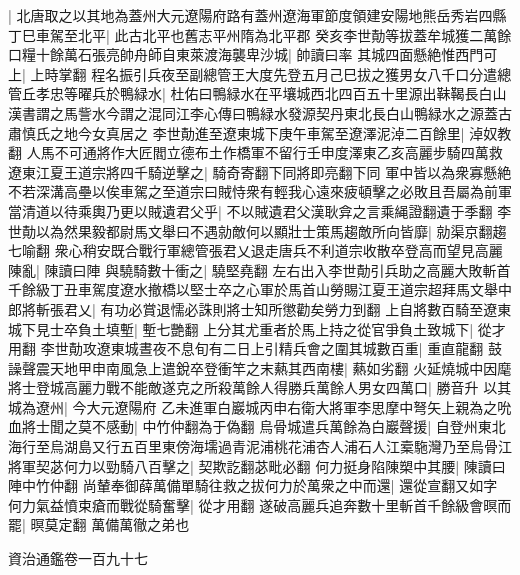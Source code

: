 |{
	北唐取之以其地為蓋州大元遼陽府路有蓋州遼海軍節度領建安陽地熊岳秀岩四縣}
丁巳車駕至北平|{
	此古北平也舊志平州隋為北平郡}
癸亥李世勣等拔蓋牟城獲二萬餘口糧十餘萬石張亮帥舟師自東萊渡海襲卑沙城|{
	帥讀曰率}
其城四面懸絶惟西門可上|{
	上時掌翻}
程名振引兵夜至副總管王大度先登五月己巳拔之獲男女八千口分遣總管丘孝忠等曜兵於鴨緑水|{
	杜佑曰鴨緑水在平壤城西北四百五十里源出靺鞨長白山漢書謂之馬訾水今謂之混同江李心傳曰鴨緑水發源契丹東北長白山鴨緑水之源蓋古肅慎氏之地今女真居之}
李世勣進至遼東城下庚午車駕至遼澤泥淖二百餘里|{
	淖奴教翻}
人馬不可通將作大匠閻立德布土作橋軍不留行壬申度澤東乙亥高麗步騎四萬救遼東江夏王道宗將四千騎逆擊之|{
	騎奇寄翻下同將即亮翻下同}
軍中皆以為衆寡懸絶不若深溝高壘以俟車駕之至道宗曰賊恃衆有輕我心遠來疲頓擊之必敗且吾屬為前軍當清道以待乘輿乃更以賊遺君父乎|{
	不以賊遺君父漢耿弇之言乘䋲證翻遺于季翻}
李世勣以為然果毅都尉馬文舉曰不遇勍敵何以顯壯士策馬趨敵所向皆靡|{
	勍渠京翻趨七喻翻}
衆心稍安既合戰行軍總管張君乂退走唐兵不利道宗收散卒登高而望見高麗陳亂|{
	陳讀曰陣}
與驍騎數十衝之|{
	驍堅堯翻}
左右出入李世勣引兵助之高麗大敗斬首千餘級丁丑車駕度遼水撤橋以堅士卒之心軍於馬首山勞賜江夏王道宗超拜馬文舉中郎將斬張君乂|{
	有功必賞退懦必誅則將士知所懲勸矣勞力到翻}
上自將數百騎至遼東城下見士卒負土填塹|{
	塹七艷翻}
上分其尤重者於馬上持之從官爭負土致城下|{
	從才用翻}
李世勣攻遼東城晝夜不息旬有二日上引精兵會之圍其城數百重|{
	重直龍翻}
鼓譟聲震天地甲申南風急上遣銳卒登衝竿之末爇其西南樓|{
	爇如劣翻}
火延燒城中因麾將士登城高麗力戰不能敵遂克之所殺萬餘人得勝兵萬餘人男女四萬口|{
	勝音升}
以其城為遼州|{
	今大元遼陽府}
乙未進軍白巖城丙申右衛大將軍李思摩中弩矢上親為之吮血將士聞之莫不感動|{
	中竹仲翻為于偽翻}
烏骨城遣兵萬餘為白巖聲援|{
	自登州東北海行至烏湖島又行五百里東傍海壖過青泥浦桃花浦杏人浦石人江槖駞灣乃至烏骨江}
將軍契苾何力以勁騎八百擊之|{
	契欺訖翻苾毗必翻}
何力挺身陷陳槊中其腰|{
	陳讀曰陣中竹仲翻}
尚輦奉御薛萬備單騎往救之拔何力於萬衆之中而還|{
	還從宣翻又如字}
何力氣益憤束瘡而戰從騎奮擊|{
	從才用翻}
遂破高麗兵追奔數十里斬首千餘級會暝而罷|{
	暝莫定翻}
萬備萬徹之弟也

資治通鑑卷一百九十七
